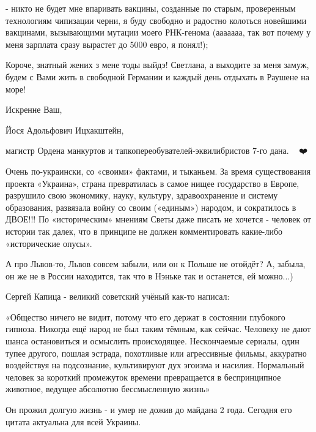 \begin{itemize}
- никто не будет мне впаривать вакцины, созданные по старым, проверенным
технологиям чипизации черни, я буду свободно и радостно колоться новейшими
вакцинами, вызывающими мутации моего РНК-генома (ааааааа, так вот почему у меня
зарплата сразу вырастет до 5000 евро, я понял!);

Короче, знатный жених з мене тоды выйдэ! Светлана, а выходите за меня замуж,
будем с Вами жить в свободной Германии и каждый день отдыхать в Раушене на
море!

Искренне Ваш,

Йося Адольфович Ицхакштейн,

магистр Ордена манкуртов и тапкопереобувателей-эквилибристов 7-го дана. 🤗\Laughey[1.0][white]😘😍❤️

%
%

Очень по-украински, со «своими» фактами, и тыканьем. За время существования
проекта «Украина», страна превратилась в самое нищее государство в Европе,
разрушило свою экономику, науку, культуру, здравоохранение и систему
образования, развязала войну со своим («единым») народом, и сократилось в
ДВОЕ!!! По «историческим» мнениям Светы даже писать не хочется - человек от
истории так далек, что в принципе не должен комментировать какие-либо
«исторические опусы».

%
%
 
А про Львов-то, Львов совсем забыли, или он к Польше не отойдёт? А, забыла, он же не в России находится, так что в Нэньке так и останется, ей можно...)

%
%

Сергей Капица - великий советский учёный как-то написал:


«Общество ничего не видит, потому что его держат в состоянии глубокого гипноза.
Никогда ещё народ не был таким тёмным, как сейчас. Человеку не дают шанса
остановиться и осмыслить происходящее. Нескончаемые сериалы, один тупее
другого, пошлая эстрада, похотливые или агрессивные фильмы, аккуратно
воздействуя на подсознание, культивируют дух эгоизма и насилия. Нормальный
человек за короткий промежуток времени превращается в беспринципное животное,
ведущее абсолютно бессмысленную жизнь»

Он прожил долгую жизнь - и умер не дожив до майдана 2 года. Сегодня его цитата
актуальна для всей Украины.

 

\end{itemize}
